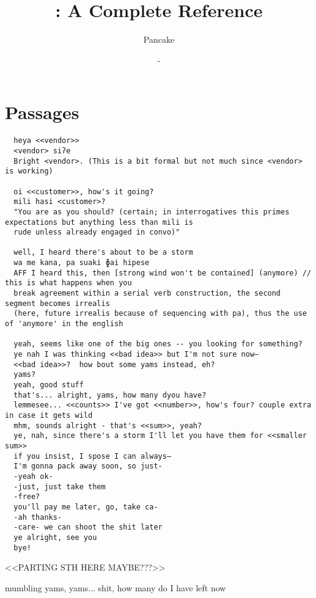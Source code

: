 \documentclass[12pt, a4paper, openright]{memoir}
\begin{document}
\title{\langname : A Complete Reference}
\author{Pancake}
\date{ - \DTMtoday}
\frontmatter
\begin{titlingpage}
  \maketitle
\end{titlingpage}

\begin{KeepFromToc}
  \tableofcontents
\end{KeepFromToc}
\mainmatter




\backmatter
\chapter{Passages}
\begin{verbatim}
  heya <<vendor>>
  <vendor> siʔe
  Bright <vendor>. (This is a bit formal but not much since <vendor> is working)

  oi <<customer>>, how's it going?
  mili hasi <customer>?
  "You are as you should? (certain; in interrogatives this primes expectations but anything less than mili is
  rude unless already engaged in convo)"

  well, I heard there's about to be a storm
  wa me kana, pa suaki ɸai hipese
  AFF I heard this, then [strong wind won't be contained] (anymore) // this is what happens when you
  break agreement within a serial verb construction, the second segment becomes irrealis
  (here, future irrealis because of sequencing with pa), thus the use of 'anymore' in the english

  yeah, seems like one of the big ones -- you looking for something?
  ye nah I was thinking <<bad idea>> but I'm not sure now—
  <<bad idea>>?  how bout some yams instead, eh?
  yams?
  yeah, good stuff
  that's... alright, yams, how many dyou have?
  lemmesee... <<counts>> I've got <<number>>, how's four? couple extra in case it gets wild
  mhm, sounds alright - that's <<sum>>, yeah?
  ye, nah, since there's a storm I'll let you have them for <<smaller sum>>
  if you insist, I spose I can always—
  I'm gonna pack away soon, so just-
  -yeah ok-
  -just, just take them
  -free?
  you'll pay me later, go, take ca-
  -ah thanks-
  -care- we can shoot the shit later
  ye alright, see you
  bye!

\end{verbatim}

<<PARTING STH HERE MAYBE???>>

mumbling yams, yams... shit, how many do I have left now
\end{document}
